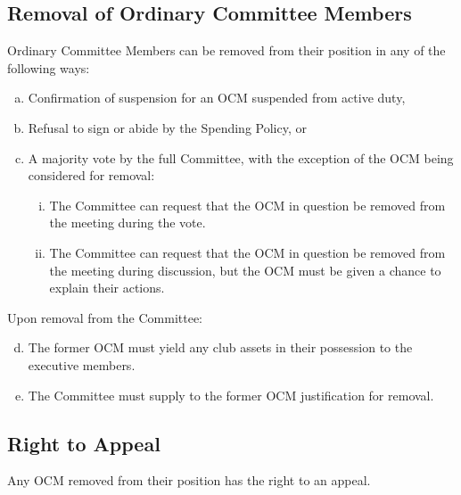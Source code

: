 \documentclass[a4paper,12pt]{article}
\begin{document}
\subsection{Removal of Ordinary Committee Members}

Ordinary Committee Members can be removed from their position in any of the following ways:

\begin{enumerate}[a)]
	\item Confirmation of suspension for an OCM suspended from active duty,
	\item Refusal to sign or abide by the Spending Policy, or
	\item A majority vote by the full Committee, with the exception of the OCM being considered for removal:
	\begin{enumerate}[i)]
		\item The Committee can request that the OCM in question be removed from the meeting during the vote.
		\item The Committee can request that the OCM in question be removed from the meeting during discussion, but the OCM must be given a chance to explain their actions.
	\end{enumerate}
\end{enumerate}

Upon removal from the Committee:

\begin{enumerate}[a)]
	\setcounter{enumi}{3}
	\item The former OCM must yield any club assets in their possession to the executive members.
	\item The Committee must supply to the former OCM justification for removal.
\end{enumerate}

\subsection{Right to Appeal}

Any OCM removed from their position has the right to an appeal.
\end{document}

